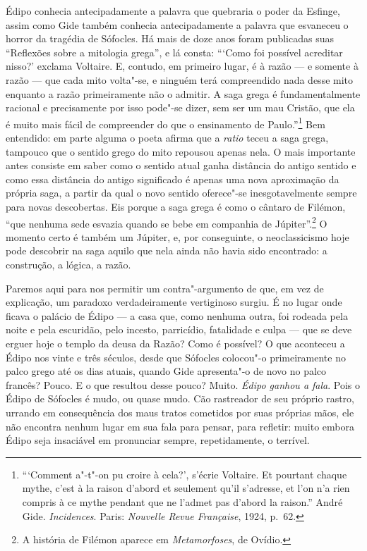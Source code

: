 Édipo conhecia antecipadamente a palavra que quebraria o poder da Esfinge,
assim como Gide também conhecia antecipadamente a palavra que
esvaneceu o horror da tragédia de Sófocles. Há mais de
doze anos foram publicadas suas ``Reflexões sobre a mitologia grega'', e lá
consta: ```Como foi possível acreditar nisso?' exclama Voltaire. E,
contudo, em primeiro lugar, é à razão --- e somente à razão --- que cada mito
volta"-se, e ninguém terá compreendido nada desse mito enquanto a razão primeiramente não
o admitir. A saga grega é fundamentalmente racional e precisamente por
isso pode"-se dizer, sem ser um mau Cristão, que ela é muito
mais fácil de compreender do que o ensinamento de Paulo.''\footnote{```Comment
  a"-t"-on pu croire à cela?', s'écrie Voltaire. Et pourtant chaque
  mythe, c'est à la raison d'abord et seulement qu'il s'adresse, et l'on
  n'a rien compris à ce mythe pendant que ne l'admet pas d'abord la
  raison.'' André Gide. \emph{Incidences}. Paris: \emph{Nouvelle Revue Française},
  1924, p.~62. \versal{[N.~T.]}} Bem entendido: em parte alguma o poeta afirma que a
\emph{ratio} teceu a saga grega, tampouco que o sentido grego do mito
repousou apenas nela. O mais importante antes consiste em saber como o
sentido atual ganha distância do antigo sentido e como essa distância do antigo
significado é apenas uma nova aproximação da própria saga, a partir da
qual o novo sentido oferece"-se inesgotavelmente sempre para novas
descobertas. Eis porque a saga grega é como o cântaro de Filémon, ``que
nenhuma sede esvazia quando se bebe em companhia de Júpiter''.\footnote{A história de Filémon aparece em \emph{Metamorfoses}, de Ovídio. \versal{[N.~O.]}} O
momento certo é também um Júpiter, e, por conseguinte, o neoclassicismo
hoje pode descobrir na saga aquilo que nela ainda não havia sido
encontrado: a construção, a lógica, a razão.

Paremos aqui para nos permitir um contra"-argumento de que, em vez de explicação,
um paradoxo verdadeiramente vertiginoso surgiu. É no lugar onde
ficava o palácio de Édipo --- a casa que, como nenhuma outra, foi rodeada
pela noite e pela escuridão, pelo incesto, parricídio, fatalidade e
culpa --- que se deve erguer hoje o templo da deusa da Razão? Como é
possível? O que aconteceu a Édipo nos vinte e três séculos, desde que
Sófocles colocou"-o primeiramente no palco grego até os dias atuais,
quando Gide apresenta"-o de novo no palco francês? Pouco. E o que
resultou desse pouco? Muito. \emph{Édipo ganhou a fala}. Pois o Édipo de
Sófocles é mudo, ou quase mudo. Cão rastreador de seu próprio rastro,
urrando em consequência dos maus tratos cometidos por suas próprias
mãos, ele não encontra nenhum lugar em sua fala para pensar, para refletir: muito
embora Édipo seja insaciável em pronunciar sempre, repetidamente, o
terrível.

